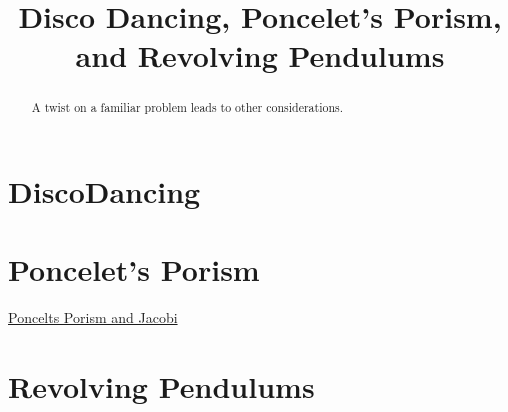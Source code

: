 \documentclass{ximera}
\title{Disco Dancing, Poncelet's Porism, and Revolving Pendulums}
\begin{document}
\begin{abstract}
A twist on a familiar problem leads to other considerations.
\end{abstract}
\maketitle

\section*{DiscoDancing}

\section*{Poncelet's Porism}


\begin{onlineOnly}
    \begin{center}
\end{center}
\end{onlineOnly}

\href{https://www.desmos.com/calculator/lwbypn9rje}{Poncelts Porism and Jacobi}

\section*{Revolving Pendulums}
\end{document}
